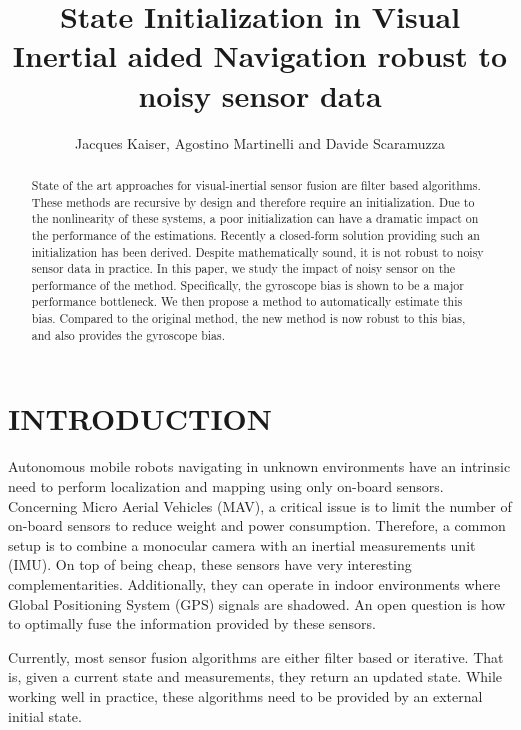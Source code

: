 \documentclass[letterpaper, 10 pt, conference]{ieeeconf}  %
\title{\LARGE \bf
State Initialization in Visual Inertial aided Navigation robust to noisy sensor data
}
\author{Jacques Kaiser, Agostino Martinelli and Davide Scaramuzza%
}
\begin{document}
\maketitle
\thispagestyle{empty}
\pagestyle{empty}


\begin{abstract}
  State of the art approaches for visual-inertial sensor fusion are filter based algorithms.
  These methods are recursive by design and therefore require an initialization.
  Due to the nonlinearity of these systems, a poor initialization can have a dramatic impact on the performance of the estimations.
  Recently a closed-form solution providing such an initialization has been derived.
  Despite mathematically sound, it is not robust to noisy sensor data in practice.
  In this paper, we study the impact of noisy sensor on the performance of the method.
  Specifically, the gyroscope bias is shown to be a major performance bottleneck.
  We then propose a method to automatically estimate this bias.
  Compared to the original method, the new method is now robust to this bias, and also provides the gyroscope bias.
\end{abstract}



\section{INTRODUCTION}




Autonomous mobile robots navigating in unknown environments have an intrinsic need to perform localization and mapping using only on-board sensors.
Concerning Micro Aerial Vehicles (MAV), a critical issue is to limit the number of on-board sensors to reduce weight and power consumption.
Therefore, a common setup is to combine a monocular camera with an inertial measurements unit (IMU).
On top of being cheap, these sensors have very interesting complementarities.
Additionally, they can operate in indoor environments where Global Positioning System (GPS) signals are shadowed.
An open question is how to optimally fuse the information provided by these sensors.

Currently, most sensor fusion algorithms are either filter based or iterative. That is, given a current state and measurements, they return an updated state.
While working well in practice, these algorithms need to be provided by an external initial state.
\end{document}
